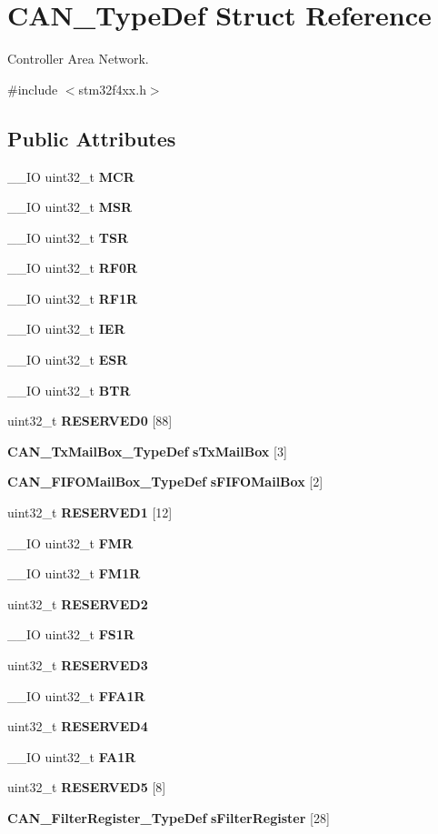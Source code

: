 \section{C\+A\+N\+\_\+\+Type\+Def Struct Reference}
\label{structCAN__TypeDef}


Controller Area Network.  




{\ttfamily \#include $<$stm32f4xx.\+h$>$}

\subsection*{Public Attributes}
\begin{DoxyCompactItemize}
\item 
\+\_\+\+\_\+\+IO uint32\+\_\+t \textbf{ M\+CR}
\item 
\+\_\+\+\_\+\+IO uint32\+\_\+t \textbf{ M\+SR}
\item 
\+\_\+\+\_\+\+IO uint32\+\_\+t \textbf{ T\+SR}
\item 
\+\_\+\+\_\+\+IO uint32\+\_\+t \textbf{ R\+F0R}
\item 
\+\_\+\+\_\+\+IO uint32\+\_\+t \textbf{ R\+F1R}
\item 
\+\_\+\+\_\+\+IO uint32\+\_\+t \textbf{ I\+ER}
\item 
\+\_\+\+\_\+\+IO uint32\+\_\+t \textbf{ E\+SR}
\item 
\+\_\+\+\_\+\+IO uint32\+\_\+t \textbf{ B\+TR}
\item 
uint32\+\_\+t \textbf{ R\+E\+S\+E\+R\+V\+E\+D0} [88]
\item 
\textbf{ C\+A\+N\+\_\+\+Tx\+Mail\+Box\+\_\+\+Type\+Def} \textbf{ s\+Tx\+Mail\+Box} [3]
\item 
\textbf{ C\+A\+N\+\_\+\+F\+I\+F\+O\+Mail\+Box\+\_\+\+Type\+Def} \textbf{ s\+F\+I\+F\+O\+Mail\+Box} [2]
\item 
uint32\+\_\+t \textbf{ R\+E\+S\+E\+R\+V\+E\+D1} [12]
\item 
\+\_\+\+\_\+\+IO uint32\+\_\+t \textbf{ F\+MR}
\item 
\+\_\+\+\_\+\+IO uint32\+\_\+t \textbf{ F\+M1R}
\item 
uint32\+\_\+t \textbf{ R\+E\+S\+E\+R\+V\+E\+D2}
\item 
\+\_\+\+\_\+\+IO uint32\+\_\+t \textbf{ F\+S1R}
\item 
uint32\+\_\+t \textbf{ R\+E\+S\+E\+R\+V\+E\+D3}
\item 
\+\_\+\+\_\+\+IO uint32\+\_\+t \textbf{ F\+F\+A1R}
\item 
uint32\+\_\+t \textbf{ R\+E\+S\+E\+R\+V\+E\+D4}
\item 
\+\_\+\+\_\+\+IO uint32\+\_\+t \textbf{ F\+A1R}
\item 
uint32\+\_\+t \textbf{ R\+E\+S\+E\+R\+V\+E\+D5} [8]
\item 
\textbf{ C\+A\+N\+\_\+\+Filter\+Register\+\_\+\+Type\+Def} \textbf{ s\+Filter\+Register} [28]
\end{DoxyCompactItemize}


